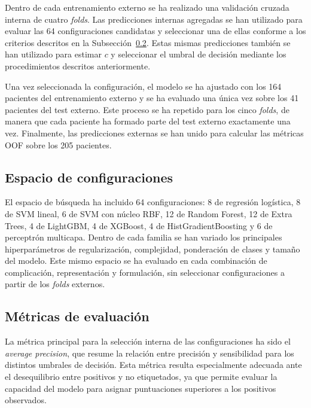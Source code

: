 Dentro de cada entrenamiento externo se ha realizado una validación cruzada interna de cuatro \textit{folds}. Las predicciones internas agregadas se han utilizado para evaluar las 64 configuraciones candidatas y seleccionar una de ellas conforme a los criterios descritos en la Subsección~\ref{subsec:metricas_pu}. Estas mismas predicciones también se han utilizado para estimar \(c\) y seleccionar el umbral de decisión mediante los procedimientos descritos anteriormente.


Una vez seleccionada la configuración, el modelo se ha ajustado con los 164 pacientes del entrenamiento externo y se ha evaluado una única vez sobre los 41 pacientes del test externo. Este proceso se ha repetido para los cinco \textit{folds}, de manera que cada paciente ha formado parte del test externo exactamente una vez. Finalmente, las predicciones externas se han unido para calcular las métricas OOF sobre los 205 pacientes.

\subsection{Espacio de configuraciones}

El espacio de búsqueda ha incluido 64 configuraciones: 8 de regresión logística, 8 de SVM lineal, 6 de SVM con núcleo RBF, 12 de Random Forest, 12 de Extra Trees, 4 de LightGBM, 4 de XGBoost, 4 de HistGradientBoosting y 6 de perceptrón multicapa. Dentro de cada familia se han variado los principales hiperparámetros de regularización, complejidad, ponderación de clases y tamaño del modelo. Este mismo espacio se ha evaluado en cada combinación de complicación, representación y formulación, sin seleccionar configuraciones a partir de los \textit{folds} externos.



\subsection{Métricas de evaluación}
\label{subsec:metricas_pu}

La métrica principal para la selección interna de las configuraciones ha sido el \textit{average precision}, que resume la relación entre precisión y sensibilidad para los distintos umbrales de decisión. Esta métrica resulta especialmente adecuada ante el desequilibrio entre positivos y no etiquetados, ya que permite evaluar la capacidad del modelo para asignar puntuaciones superiores a los positivos observados.

